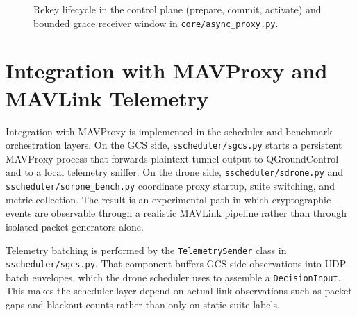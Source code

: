 \documentclass[conference]{IEEEtran}
\begin{document}
\begin{figure}[htbp]
\centering
{}
\caption{Rekey lifecycle in the control plane (prepare, commit, activate) and bounded grace receiver window in \texttt{core/async\_proxy.py}.}
\label{fig:rekey-lifecycle}
\end{figure}

\section{Integration with MAVProxy and MAVLink Telemetry}
Integration with MAVProxy is implemented in the scheduler and benchmark orchestration layers. On the GCS side, \texttt{sscheduler/sgcs.py} starts a persistent MAVProxy process that forwards plaintext tunnel output to QGroundControl and to a local telemetry sniffer. On the drone side, \texttt{sscheduler/sdrone.py} and \texttt{sscheduler/sdrone\_bench.py} coordinate proxy startup, suite switching, and metric collection. The result is an experimental path in which cryptographic events are observable through a realistic MAVLink pipeline rather than through isolated packet generators alone.

Telemetry batching is performed by the \texttt{TelemetrySender} class in \texttt{sscheduler/sgcs.py}. That component buffers GCS-side observations into UDP batch envelopes, which the drone scheduler uses to assemble a \texttt{DecisionInput}. This makes the scheduler layer depend on actual link observations such as packet gaps and blackout counts rather than only on static suite labels.
\end{document}
